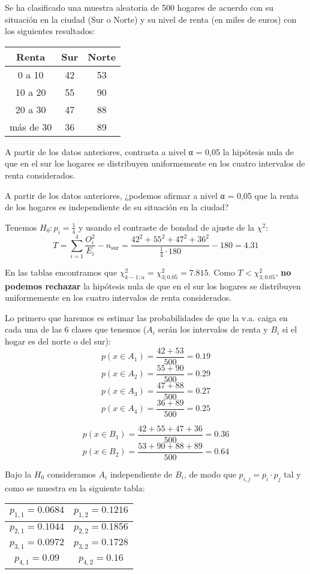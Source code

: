 \begin{problem}[8] Se ha clasificado una muestra aleatoria de 500 hogares de acuerdo con su situación en la ciudad
(Sur o Norte) y su nivel de renta (en miles de euros) con los siguientes resultados:
\begin{center}
	\begin{tabular}{c c c}
		\hline
		Renta & Sur & Norte\\ \hline
		0 a 10 & 42 & 53 \\
		10 a 20 & 55 & 90 \\
		20 a 30 & 47 & 88 \\
		más de 30 & 36 & 89\\ \hline
	\end{tabular}
\end{center}

\ppart
A partir de los datos anteriores, contrasta a nivel α = 0,05 la hipótesis nula de que en el sur los
hogares se distribuyen uniformemente en los cuatro intervalos de renta considerados.

\ppart
A partir de los datos anteriores, ¿podemos afirmar a nivel α = 0,05 que la renta de los hogares
es independiente de su situación en la ciudad?
\solution


\spart
Tenemos $H_0: p_i=\frac{1}{4}$ y usando el contraste de bondad de ajuste de la $χ^2$:
\[T = \sum_{i=1}^4 \frac{O_i^2}{E_i} - n_{\text{sur}} = \frac{42^2 + 55^2 + 47^2 + 36^2}{\frac{1}{4}·180} - 180 = 4.31\]

En las tablas encontramos que $χ^2_{k-1;α} = χ^2_{3;0.05} = 7.815$. Como $T<χ^2_{3;0.05}$, \textbf{no podemos rechazar} la hipótesis nula de que en el sur los hogares se distribuyen uniformemente en los cuatro intervalos de renta considerados.

\spart
Lo primero que haremos es estimar las probabilidades de que la v.a. caiga en cada una de las 6 clases que tenemos ($A_i$ serán los intervalos de renta y $B_i$ si el hogar es del norte o del sur):
\[p(x∈A_1) = \frac{42+53}{500} = 0.19\]
\[p(x∈A_2) = \frac{55+90}{500} = 0.29\]
\[p(x∈A_3) = \frac{47+88}{500} = 0.27\]
\[p(x∈A_4) = \frac{36+89}{500} = 0.25\]

\[p(x∈B_1) = \frac{42+55+47+36}{500} = 0.36\]
\[p(x∈B_2) = \frac{53+90+88+89}{500} = 0.64\]

Bajo la $H_0$ consideramos $A_i$ independiente de $B_i$, de modo que $p_{i,j} = p_i·p_j$ tal y como se muestra en la siguiente tabla:

\begin{center}
	\begin{tabular}{c | c}
		$p_{1,1} = 0.0684$ & $p_{1,2} = 0.1216$\\ \hline
		$p_{2,1} = 0.1044$ & $p_{2,2} = 0.1856$\\ \hline
		$p_{3,1} = 0.0972$ & $p_{3,2} = 0.1728$\\ \hline
		$p_{4,1} = 0.09$ & $p_{4,2} = 0.16$
	\end{tabular}
\end{center}


\end{problem}
